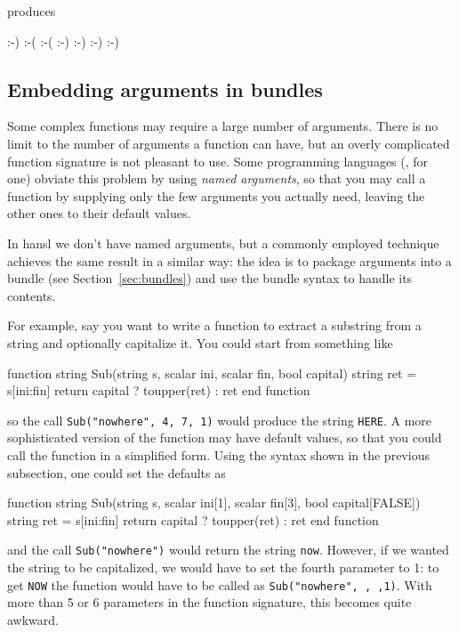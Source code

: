 produces

\begin{code}
:-)
:-( :-(
:-) :-) :-) :-)
\end{code}

\subsection{Embedding arguments in bundles}

Some complex functions may require a large number of arguments. There is no
limit to the number of arguments a function can have, but an overly
complicated function signature is not pleasant to use. Some programming
languages (, for one) obviate this problem by using \emph{named
  arguments}, so that you may call a function by supplying only the few
arguments you actually need, leaving the other ones to their default values.

In hansl we don't have named arguments, but a commonly employed technique
achieves the same result in a similar way: the idea is to package arguments
into a bundle (see Section~\ref{sec:bundles}) and use the bundle syntax to
handle its contents.

For example, say you want to write a function to extract a substring from a
string and optionally capitalize it. You could start from something like
\begin{code}
function string Sub(string s, scalar ini, scalar fin, bool capital)
    string ret = s[ini:fin]
    return capital ? toupper(ret) : ret
end function
\end{code}
so the call \texttt{Sub("nowhere", 4, 7, 1)} would produce the string
\texttt{HERE}. A more sophisticated version of the function may have default
values, so that you could call the function in a simplified form. Using the
syntax shown in the previous subsection, one could set the defaults as
\begin{code}
function string Sub(string s, scalar ini[1], scalar fin[3], bool capital[FALSE])
    string ret = s[ini:fin]
    return capital ? toupper(ret) : ret
end function
\end{code}
and the call \texttt{Sub("nowhere")} would return the string
\texttt{now}. However, if we wanted the string to be capitalized, we would
have to set the fourth parameter to 1: to get \texttt{NOW} the function
would have to be called as \texttt{Sub("nowhere", , ,1)}. With more than 5
or 6 parameters in the function signature, this becomes quite awkward.

